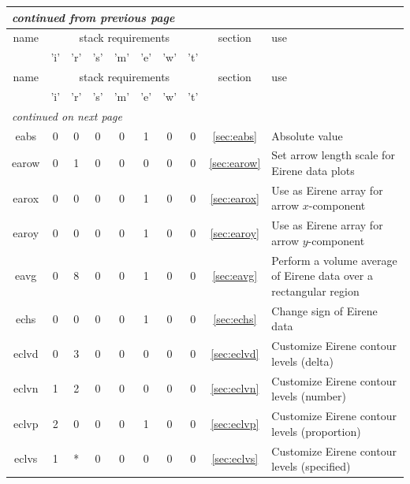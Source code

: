 \documentclass[a4paper,10pt]{report}
\begin{document}
\begin{center}
  \begin{longtable}{|c|c|c|c|c|c|c|c|c|l|}
    \hline
    \multicolumn{10}{|l|}{\small\sl continued from previous page} \\
    \hline name & \multicolumn{7}{|c|}{stack requirements} & section & use \\
    \hline   & 'i' & 'r' & 's' & 'm' & 'e' & 'w' & 't' &   &   \\
    \hline \endhead
    \hline name & \multicolumn{7}{|c|}{stack requirements} & section & use \\
    \hline   & 'i' & 'r' & 's' & 'm' & 'e' & 'w' & 't' &   &   \\
    \hline \endfirsthead
    \hline
    \multicolumn{10}{|l|}{\small\sl continued on next page} \\
    \hline \endfoot
    \endlastfoot
    eabs \index{b2plot, eabs}      & 0 & 0 & 0 & 0 & 1 & 0 & 0 & \ref{sec:eabs}     & Absolute value \\
    earow \index{b2plot, earow}    & 0 & 1 & 0 & 0 & 0 & 0 & 0 & \ref{sec:earow}   & Set arrow length scale for Eirene data plots \\
    earox \index{b2plot, earox}    & 0 & 0 & 0 & 0 & 1 & 0 & 0 & \ref{sec:earox}  & Use as Eirene array for arrow $x$-component \\
    earoy \index{b2plot, earoy}    & 0 & 0 & 0 & 0 & 1 & 0 & 0 & \ref{sec:earoy}  & Use as Eirene array for arrow $y$-component \\
    eavg \index{b2plot, eavg}    & 0 & 8 & 0 & 0 & 1 & 0 & 0 & \ref{sec:eavg}  & Perform a volume average of Eirene data over a rectangular region \\
    echs \index{b2plot, echs}      & 0 & 0 & 0 & 0 & 1 & 0 & 0 & \ref{sec:echs}     & Change sign of Eirene data \\
    eclvd \index{b2plot, eclvd}    & 0 & 3 & 0 & 0 & 0 & 0 & 0 & \ref{sec:eclvd}    & Customize Eirene contour levels (delta) \\
    eclvn \index{b2plot, eclvn}    & 1 & 2 & 0 & 0 & 0 & 0 & 0 & \ref{sec:eclvn}    & Customize Eirene contour levels (number) \\
    eclvp \index{b2plot, eclvp}    & 2 & 0 & 0 & 0 & 1 & 0 & 0 & \ref{sec:eclvp}    & Customize Eirene contour levels (proportion) \\
    eclvs \index{b2plot, eclvs}    & 1 & * & 0 & 0 & 0 & 0 & 0 & \ref{sec:eclvs}    & Customize Eirene contour levels (specified) \\

\end{longtable}
\end{center}
\end{document}
